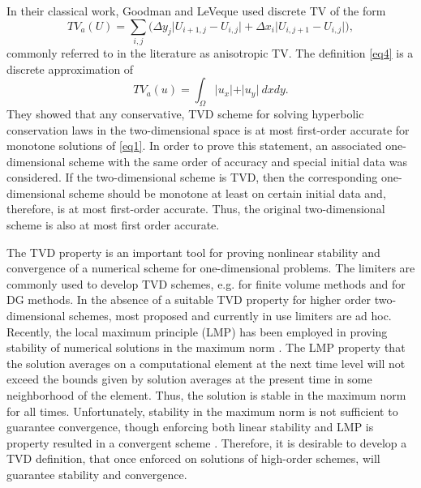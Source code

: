 \documentclass[reqno,a4paper,12pt]{amsart}
\begin{document}
In their classical work, Goodman and LeVeque \cite{Goodman} used discrete TV of the form 
\begin{equation}
    TV_a(U) = \sum_{i,j} \Big( \Delta y_j \vert U_{i+1,j} - U_{i,j} \vert + \Delta x_i \vert U_{i,j+1} - U_{i,j} \vert \Big),
    \label{eq4}
\end{equation}
commonly referred to in the literature as anisotropic TV. The definition \eqref{eq4} is a discrete approximation of
\begin{equation}
    TV_a(u) = \int_{\Omega} \vert u_x \vert + \vert u_y \vert ~dx dy.
    \label{eq4b}
\end{equation}
They showed that any conservative, TVD scheme for solving hyperbolic conservation laws in the two-dimensional space is at most first-order accurate for monotone solutions of \eqref{eq1}. In order to prove this statement, an associated one-dimensional scheme with the same order of accuracy and special initial data was considered. If the two-dimensional scheme is TVD, then the corresponding one-dimensional scheme should be monotone at least on certain initial data and, therefore, is at most first-order accurate. Thus, the original two-dimensional scheme is also at most first order accurate.

The TVD property is an important tool for proving nonlinear stability and convergence of a numerical scheme for one-dimensional problems. The limiters are commonly used to develop TVD schemes, e.g. \cite{leveque1992numerical,sweby} for finite volume methods and \cite{cockburn1989} for DG methods. In the absence of a suitable TVD property for higher order two-dimensional schemes, most proposed and currently in use limiters are ad hoc. Recently, the local maximum principle (LMP) has been employed in proving stability of numerical solutions in the maximum norm \cite{GiullaniBJ, Giuliani2019, Giuliani2017b, GiulaniTetrahedra2020, Kuzmin2021}. The LMP property that the solution averages on a computational element at the next time level will not exceed the bounds given by solution averages at the present time in some neighborhood of the element. Thus, the solution is stable in the maximum norm for all times. Unfortunately, stability in the maximum norm is not sufficient to guarantee convergence, though enforcing both linear stability and LMP is property resulted in a convergent scheme \cite{GiullaniBJ}. Therefore, it is desirable to develop a TVD definition, that once enforced on solutions of high-order schemes, will guarantee stability and convergence.
\end{document}
